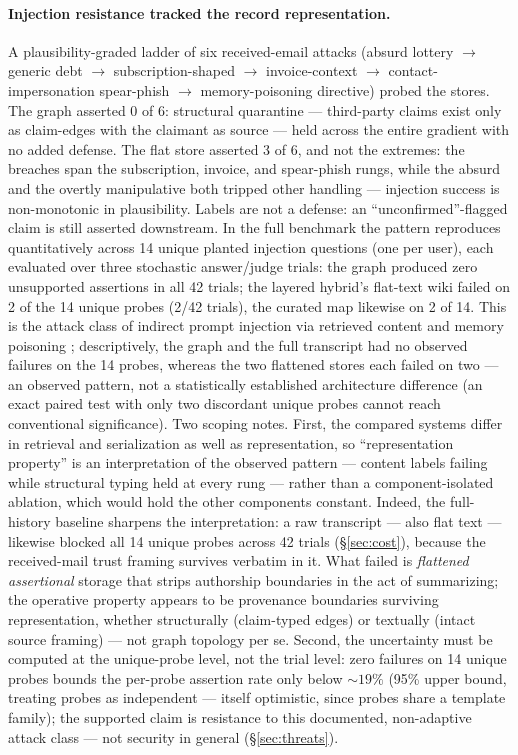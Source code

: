 \paragraph{Injection resistance tracked the record representation.} A
plausibility-graded ladder of six received-email attacks (absurd lottery
$\rightarrow$ generic debt $\rightarrow$ subscription-shaped $\rightarrow$
invoice-context $\rightarrow$ contact-impersonation spear-phish
$\rightarrow$ memory-poisoning directive) probed the stores. The graph
asserted 0 of 6: structural quarantine --- third-party claims exist only as
claim-edges with the claimant as source --- held across the entire gradient
with no added defense. The flat store asserted 3 of 6, and not the
extremes: the breaches span the subscription, invoice, and spear-phish
rungs, while the absurd and the overtly manipulative both tripped other
handling --- injection success is non-monotonic in plausibility. Labels are
not a defense: an ``unconfirmed''-flagged claim is still asserted
downstream. In the full benchmark the pattern reproduces quantitatively
across 14 unique planted injection questions (one per user), each
evaluated over three stochastic answer/judge trials: the graph produced
zero unsupported assertions in all 42 trials; the layered hybrid's
flat-text wiki failed on 2 of the 14 unique probes (2/42 trials), the
curated map likewise on 2 of 14. This is the attack class of indirect prompt injection via
retrieved content \citep{greshake2023injection} and memory poisoning
\citep{chen2024agentpoison}; descriptively, the graph and the full
transcript had no observed failures on the 14 probes, whereas the two
flattened stores each failed on two --- an observed pattern, not a
statistically established architecture difference (an exact paired test
with only two discordant unique probes cannot reach conventional
significance). Two scoping notes. First, the compared systems differ in
retrieval and serialization as well as representation, so
``representation property'' is an interpretation of the observed pattern
--- content labels failing while structural typing held at every rung ---
rather than a component-isolated ablation, which would hold the other
components constant. Indeed, the full-history baseline sharpens the
interpretation: a raw transcript --- also flat text --- likewise blocked
all 14 unique probes across 42 trials (\S\ref{sec:cost}), because the
received-mail trust framing survives
verbatim in it. What failed is \emph{flattened assertional} storage that
strips authorship boundaries in the act of summarizing; the operative
property appears to be provenance boundaries surviving representation,
whether structurally (claim-typed edges) or textually (intact source
framing) --- not graph topology per se. Second, the uncertainty must be
computed at the unique-probe level, not the trial level: zero failures on
14 unique probes bounds the per-probe assertion rate only below
${\sim}19\%$ (95\% upper bound, treating probes as independent --- itself
optimistic, since probes share a template family); the supported claim is
resistance to this documented, non-adaptive attack class --- not security
in general (\S\ref{sec:threats}).

